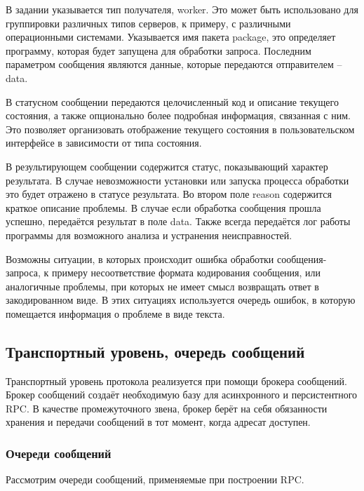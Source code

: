 

В задании указывается тип получателя, worker. Это может быть использовано
для группировки различных типов серверов, к примеру, с различными операционными
системами. Указывается имя пакета package, это определяет программу, которая
будет запущена для обработки запроса. Последним параметром сообщения являются
данные, которые передаются отправителем -- data.

В статусном сообщении передаются целочисленный код и описание текущего
состояния, а также опционально более подробная информация, связанная с ним.
Это позволяет организовать отображение текущего состояния в пользовательском
интерфейсе в зависимости от типа состояния.

В результирующем сообщении содержится статус, показывающий характер результата.
В случае невозможности установки или запуска процесса обработки это будет
отражено в статусе результата. Во втором поле reason содержится краткое
описание проблемы. В случае если обработка сообщения прошла успешно,
передаётся результат в поле data. Также всегда передаётся лог работы
программы для возможного анализа и устранения неисправностей.

Возможны ситуации, в которых происходит ошибка обработки сообщения-запроса,
к примеру несоответствие формата кодирования сообщения, или аналогичные
проблемы, при которых не имеет смысл возвращать ответ в закодированном виде.
В этих ситуациях используется очередь ошибок, в которую помещается
информация о проблеме в виде текста.

\subsection{Транспортный уровень, очередь сообщений}
Транспортный уровень протокола реализуется при помощи брокера сообщений.
Брокер сообщений создаёт необходимую базу для асинхронного и персистентного RPC.
В качестве промежуточного звена, брокер берёт на себя обязанности хранения
и передачи сообщений в тот момент, когда адресат доступен.

\subsubsection{Очереди сообщений}
Рассмотрим очереди сообщений, применяемые при построении RPC.

